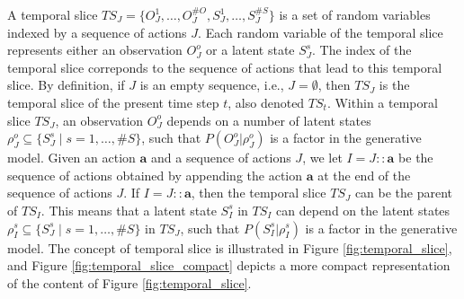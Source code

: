 \documentclass[twoside,11pt]{article}
\newcommand{\nb}[1]{\# #1}
\begin{document}
A temporal slice $TS_J = \{O_J^1, \hdots, O_J^{\nb{O}}, S_J^1, \hdots, S_J^{\nb{S}}\}$ is a set of random variables indexed by a sequence of actions $J$. Each random variable of the temporal slice represents either an observation $O_J^o$ or a latent state $S_J^s$. The index of the temporal slice correponds to the sequence of actions that lead to this temporal slice. By definition, if $J$ is an empty sequence, i.e., $J = \emptyset$, then $TS_J$ is the temporal slice of the present time step $t$, also denoted $TS_t$. Within a temporal slice $TS_J$, an observation $O_J^o$ depends on a number of latent states $\rho_J^o \subseteq \{S_J^s \mid s = 1, \hdots, \nb{S}\}$, such that $P(O_J^o|\rho_J^o)$ is a factor in the generative model. Given an action $\bm{a}$ and a sequence of actions $J$, we let $I = J{::}\bm{a}$ be the sequence of actions obtained by appending the action $\bm{a}$ at the end of the sequence of actions $J$. If $I = J{::}\bm{a}$, then the temporal slice $TS_J$ can be the parent of $TS_I$. This means that a latent state $S^s_I$ in $TS_I$ can depend on the latent states $\rho_I^s \subseteq \{S_J^s \mid s = 1, \hdots, \nb{S}\}$ in $TS_J$, such that $P(S_I^s|\rho_I^s)$ is a factor in the generative model. The concept of temporal slice is illustrated in Figure \ref{fig:temporal_slice}, and Figure \ref{fig:temporal_slice_compact} depicts a more compact representation of the content of Figure \ref{fig:temporal_slice}.
\end{document}
